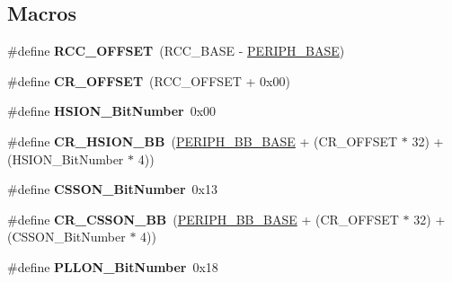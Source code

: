 \subsection*{Macros}
\begin{DoxyCompactItemize}
\item 
\mbox{\label{group___r_c_c_ga539e07c3b3c55f1f1d47231341fb11e1}} 
\#define {\bfseries R\+C\+C\+\_\+\+O\+F\+F\+S\+ET}~(R\+C\+C\+\_\+\+B\+A\+SE -\/ \hyperlink{group___peripheral__memory__map_ga9171f49478fa86d932f89e78e73b88b0}{P\+E\+R\+I\+P\+H\+\_\+\+B\+A\+SE})
\item 
\mbox{\label{group___r_c_c_gafa1d3d0ea72132df651c76fc1bdffffc}} 
\#define {\bfseries C\+R\+\_\+\+O\+F\+F\+S\+ET}~(R\+C\+C\+\_\+\+O\+F\+F\+S\+ET + 0x00)
\item 
\mbox{\label{group___r_c_c_ga3d3085e491cbef815d223afbe5bf1930}} 
\#define {\bfseries H\+S\+I\+O\+N\+\_\+\+Bit\+Number}~0x00
\item 
\mbox{\label{group___r_c_c_gac3290a833c0e35ec17d32c2d494e6133}} 
\#define {\bfseries C\+R\+\_\+\+H\+S\+I\+O\+N\+\_\+\+BB}~(\hyperlink{group___peripheral__memory__map_gaed7efc100877000845c236ccdc9e144a}{P\+E\+R\+I\+P\+H\+\_\+\+B\+B\+\_\+\+B\+A\+SE} + (C\+R\+\_\+\+O\+F\+F\+S\+ET $\ast$ 32) + (H\+S\+I\+O\+N\+\_\+\+Bit\+Number $\ast$ 4))
\item 
\mbox{\label{group___r_c_c_ga253fa44d87aabc55f0cd6628e77a51fd}} 
\#define {\bfseries C\+S\+S\+O\+N\+\_\+\+Bit\+Number}~0x13
\item 
\mbox{\label{group___r_c_c_gaca914aed10477ae4090fea0a9639b1ea}} 
\#define {\bfseries C\+R\+\_\+\+C\+S\+S\+O\+N\+\_\+\+BB}~(\hyperlink{group___peripheral__memory__map_gaed7efc100877000845c236ccdc9e144a}{P\+E\+R\+I\+P\+H\+\_\+\+B\+B\+\_\+\+B\+A\+SE} + (C\+R\+\_\+\+O\+F\+F\+S\+ET $\ast$ 32) + (C\+S\+S\+O\+N\+\_\+\+Bit\+Number $\ast$ 4))
\item 
\mbox{\label{group___r_c_c_gab24d7f5f8e4b3b717fd91b54f393f6a3}} 
\#define {\bfseries P\+L\+L\+O\+N\+\_\+\+Bit\+Number}~0x18
\item 
\mbox{\label{group___r_c_c_ga3f1fb2589cb8b5ac2f7121aba1135a5f}} 

\end{DoxyCompactItemize}
